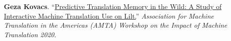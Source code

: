 
\textbf{Geza Kovacs}. ``\href{https://aclanthology.org/2020.amta-impact.7/}{Predictive Translation Memory in the Wild: A Study of Interactive Machine Translation Use on Lilt.}'' \emph{Association for Machine Translation in the Americas (AMTA) Workshop on the Impact of Machine Translation 2020}.\\